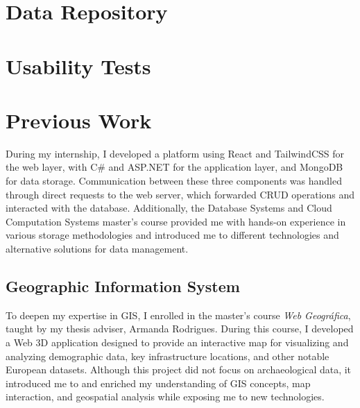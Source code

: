 \section{Data Repository}
\label{sec:data_repository}


\section{Usability Tests}
\label{sec:usability_tests}




\section{Previous Work}
\label{sec:previous_work}

During my internship, I developed a platform using React and TailwindCSS for the web layer, with C\# and ASP.NET for the application layer, and MongoDB for data storage. Communication between these three components was handled through direct requests to the web server, which forwarded \gls{CRUD} operations and interacted with the database.  
Additionally, the Database Systems and Cloud Computation Systems master's course provided me with hands-on experience in various storage methodologies and introduced me to different technologies and alternative solutions for data management.

\subsection{Geographic Information System}
\label{sec:gis_previous} 

To deepen my expertise in \gls{GIS}, I enrolled in the master's course \textit{Web Geográfica}, taught by my thesis adviser, Armanda Rodrigues. During this course, I developed a Web \gls{3D} application designed to provide an interactive map for visualizing and analyzing demographic data, key infrastructure locations, and other notable European datasets. Although this project did not focus on archaeological data, it introduced me to and enriched my understanding of GIS concepts, map interaction, and geospatial analysis while exposing me to new technologies.


